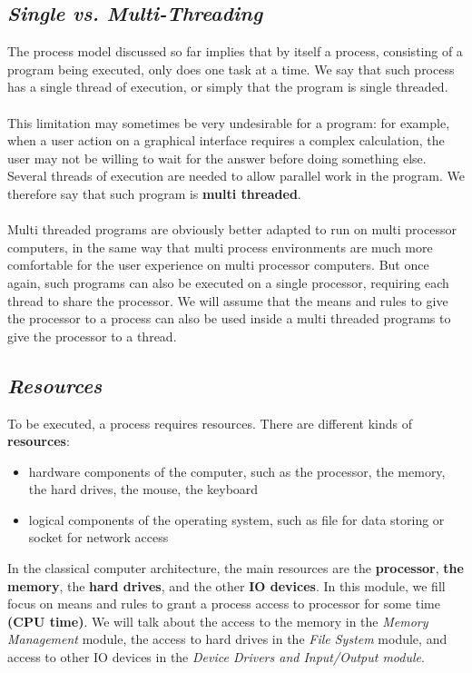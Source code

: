 \documentclass[11pt,a4paper]{scrreprt}
\begin{document}
\subsection{\textit{Single vs. Multi-Threading}}
The process model discussed so far implies that by itself a process, consisting of a program being executed, only does one task at a time. We say that such process has a single thread of execution, or simply that the program is single threaded.\\\\
This limitation may sometimes be very undesirable for a program: for example, when a user action on a graphical interface requires a complex calculation, the user may not be willing to wait for the answer before doing something else. Several threads of execution are needed to allow parallel work in the program. We therefore say that such program is \textbf{multi threaded}.\\\\
Multi threaded programs are obviously better adapted to run on multi processor computers, in the same way that multi process environments are much more comfortable for the user experience on multi processor computers. But once again, such programs can also be executed on a single processor, requiring each thread to share the processor. We will assume that the means and rules to give the processor to a process can also be used inside a multi threaded programs to give the processor to a thread.

\subsection{\textit{Resources}}
To be executed, a process requires resources. There are different kinds of \textbf{resources}:
\begin{itemize}
\item hardware components of the computer, such as the processor, the memory, the hard drives, the mouse, the keyboard
\item logical components of the operating system, such as file for data storing or socket for network access
\end{itemize}
In the classical computer architecture, the main resources are the \textbf{processor}, \textbf{the memory}, the \textbf{hard drives}, and the other \textbf{IO devices}. In this module, we fill focus on means and rules to grant a process access to processor for some time \textbf{(CPU time)}. We will talk about the access to the memory in the \textit{Memory Management} module, the access to hard drives in the \textit{File System} module, and access to other IO devices in the \textit{Device Drivers and Input/Output module}.
\end{document}
